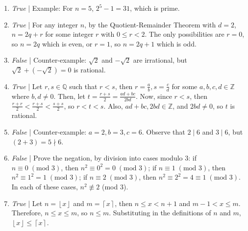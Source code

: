 \documentclass[a4paper,12pt]{article}
\newcommand{\floor}[1]{\left\lfloor #1 \right\rfloor}
\newcommand{\ceil}[1]{\left\lceil #1 \right\rceil}
\begin{document}
\begin{enumerate}
\item {\em True} | Example: For $n = 5$, $2^5 - 1 = 31$, which is prime.
\item {\em True} | For any integer $n$, by the Quotient-Remainder Theorem with
$d = 2$, $n = 2q + r$ for some integer $r$ with $0 \leq r < 2$. The only
possibilities are $r = 0$, so $n = 2q$ which is even, or $r = 1$, so $n = 2q+1$
which is odd.
\item {\em False} | Counter-example: $\sqrt{2}$ and $-\sqrt{2}$ are irrational,
but $\sqrt{2} + (-\sqrt{2}) = 0$ is rational.
\item {\em True} | Let $r, s \in \mathbb{Q}$ such that $r < s$, then $r = \frac{a}{b},
s = \frac{c}{d}$ for some $a, b, c, d \in \mathbb{Z}$ where $b, d \neq 0$. Then,
let $t = \frac{r+s}{2} = \frac{ad + bc}{2bd}$. Now, since $r < s$, then 
$\frac{r + r}{2} < \frac{r + s}{2} < \frac{s + s}{2}$, so $r < t < s$. Also,
$ad + bc, 2bd \in \mathbb{Z}$, and $2bd \neq 0$, so $t$ is rational.
\item {\em False} | Counter-example: $a = 2, b = 3, c = 6$. Observe that
$2 \mid 6$ and $3 \mid 6$, but $(2 + 3) = 5 \nmid 6$.
\item {\em False} | Prove the negation, by division into cases modulo 3:
if $n \equiv 0 \; (\text{mod } 3)$, then $n^2 \equiv 0^2 = 0 \; (\text{mod } 3)$;
if $n \equiv 1 \; (\text{mod } 3)$, then $n^2 \equiv 1^2 = 1 \; (\text{mod } 3)$;
if $n \equiv 2 \; (\text{mod } 3)$, then $n^2 \equiv 2^2 = 4 \equiv 1 \; (\text{mod } 3)$.
In each of these cases, $n^2 \not\equiv 2$ (mod 3).
\item {\em True} | Let $n = \floor{x}$ and $m = \ceil{x}$, then $n \leq x < n + 1$
and $m-1 < x \leq m$. Therefore, $n \leq x \leq m$, so $n \leq m$. Substituting
in the definitions of $n$ and $m$, $\floor{x} \leq \ceil{x}$.
\end{enumerate}
\end{document}

